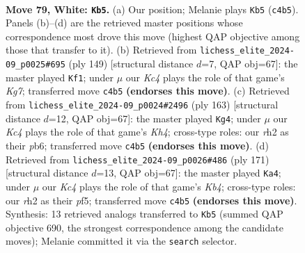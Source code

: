 \documentclass[11pt]{article}
\begin{document}
\clearpage

\begin{figure}[p]\centering
\begin{subfigure}{0.46\textwidth}\centering
\resizebox{\linewidth}{!}{%
\newchessgame
\chessboard[
  setfen={3Q4/8/5pk1/8/2K5/6P1/7r/2q5 w - - 8 79},
  showmover=false,
  pgfstyle=straightmove, color=movearrow, markmove={c4-b5}
]}
\caption{}
\end{subfigure}\hfill
\begin{subfigure}{0.46\textwidth}\centering
\resizebox{\linewidth}{!}{%
\newchessgame
\chessboard[
  setfen={8/8/1P6/2K5/8/1q6/3Q2k1/8 b - - 2 75},
  showmover=false,
  pgfstyle=straightmove, color=movearrow, markmove={g2-f1}
]}
\caption{}
\end{subfigure}
\\[4pt]
\begin{subfigure}{0.46\textwidth}\centering
\resizebox{\linewidth}{!}{%
\newchessgame
\chessboard[
  setfen={8/8/1P6/7k/8/2K5/7Q/5q2 b - - 8 82},
  showmover=false,
  pgfstyle=straightmove, color=movearrow, markmove={h5-g4}
]}
\caption{}
\end{subfigure}\hfill
\begin{subfigure}{0.46\textwidth}\centering
\resizebox{\linewidth}{!}{%
\newchessgame
\chessboard[
  setfen={1Q6/8/5p2/1k1K1P2/8/8/8/8 b - - 8 86},
  showmover=false,
  pgfstyle=straightmove, color=movearrow, markmove={b5-a4}
]}
\caption{}
\end{subfigure}
\caption{\textbf{Move 79, White: \texttt{Kb5}.} (a) Our position; Melanie plays \texttt{Kb5} (\texttt{c4b5}). Panels (b)--(d) are the retrieved master positions whose correspondence most drove this move (highest QAP objective among those that transfer to it). (b) Retrieved from \texttt{lichess\_elite\_2024-09\_p0025\#695} (ply 149) [structural distance $d$=7, QAP obj=67]: the master played \texttt{Kf1}; under $\mu$ our \emph{Kc4} plays the role of that game's \emph{Kg7}; transferred move \texttt{c4b5} \textbf{(endorses this move)}. (c) Retrieved from \texttt{lichess\_elite\_2024-09\_p0024\#2496} (ply 163) [structural distance $d$=12, QAP obj=67]: the master played \texttt{Kg4}; under $\mu$ our \emph{Kc4} plays the role of that game's \emph{Kh4}; cross-type roles: our \emph{r}h2 as their \emph{p}b6; transferred move \texttt{c4b5} \textbf{(endorses this move)}. (d) Retrieved from \texttt{lichess\_elite\_2024-09\_p0026\#486} (ply 171) [structural distance $d$=13, QAP obj=67]: the master played \texttt{Ka4}; under $\mu$ our \emph{Kc4} plays the role of that game's \emph{Kb4}; cross-type roles: our \emph{r}h2 as their \emph{p}f5; transferred move \texttt{c4b5} \textbf{(endorses this move)}. Synthesis: 13 retrieved analogs transferred to \texttt{Kb5} (summed QAP objective 690, the strongest correspondence among the candidate moves); Melanie committed it via the \texttt{search} selector.}
\label{fig:thought-m156}
\end{figure}
\end{document}
